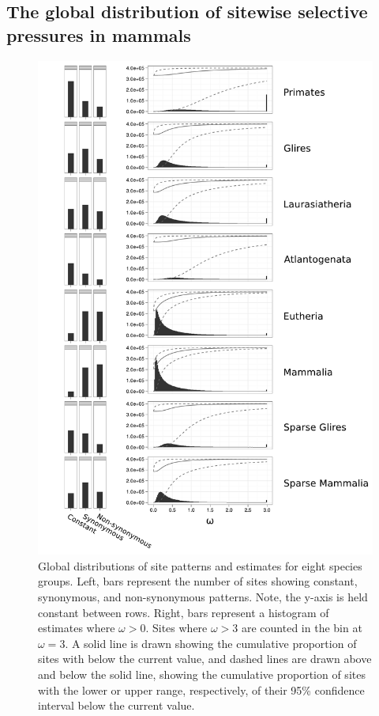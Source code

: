 \subsection{The global distribution of sitewise selective pressures in mammals}

\begin{figure}
\centering \includegraphics[scale=0.55]{Figs/global_distributions.pdf}
\caption{\scriptsize Global distributions of site patterns and \omg estimates for
  eight species groups. Left, bars represent the number of sites
  showing constant, synonymous, and non-synonymous patterns. Note, the
  y-axis is held constant between rows. Right, bars represent a
  histogram of \ml \omg estimates where $\omega>0$. Sites where
  $\omega>3$ are counted in the bin at $\omega=3$. A solid line is
  drawn showing the cumulative proportion of sites with \omg below the
  current value, and dashed lines are drawn above and below the solid
  line, showing the cumulative proportion of sites with the lower or
  upper range, respectively, of their 95\% confidence interval below
  the current value.}
\label{global_distributions}
\end{figure}

